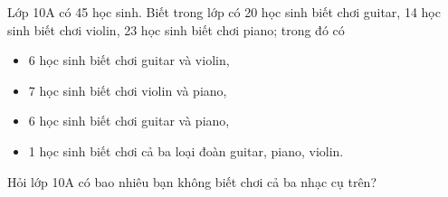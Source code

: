 \begin{ex}
Lớp 10A có 45 học sinh. Biết trong lớp có 20 học sinh biết chơi guitar, 14 học sinh biết chơi violin, 23 học sinh biết chơi piano; trong đó có
\begin{itemize}
    \item 6 học sinh biết chơi guitar và violin,
    \item 7 học sinh biết chơi violin và piano,
    \item 6 học sinh biết chơi guitar và piano,
    \item 1 học sinh biết chơi cả ba loại đoàn guitar, piano, violin.
\end{itemize}
Hỏi lớp 10A có bao nhiêu bạn không biết chơi cả ba nhạc cụ trên?
\end{ex}
